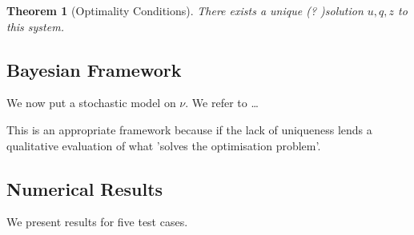 \documentclass{article}
\newtheorem{theorem}{Theorem}
\begin{document}
\begin{theorem}[Optimality Conditions]
There exists a unique (? )solution $u, q, z$ to this system.
\end{theorem}

\subsection{Bayesian Framework}\label{sec:bayesian}

We now put a stochastic model on $\nu$. We refer to \dots

This is an appropriate framework because if the lack of uniqueness lends a
qualitative evaluation of what 'solves the optimisation problem'. 

\subsection{Numerical Results}\label{sec:numerical}

We present results for five test cases.






\end{document}
